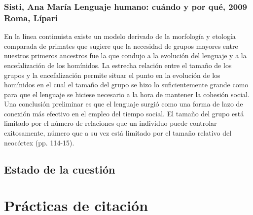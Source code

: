 \documentclass[12pt, a4paper, oneside]{report}
\begin{document}
        \subsection{Sisti, Ana María
        Lenguaje humano: cuándo y por qué, 2009
        Roma, Lípari}
        En la línea continuista existe un modelo derivado de la morfología y etología comparada de primates que sugiere que la necesidad de grupos mayores entre nuestros primeros ancestros fue la que condujo a la evolución del lenguaje y a la encefalización de los homínidos. La estrecha relación entre el tamaño de los grupos y la encefalización permite situar el punto en la evolución de los homínidos en el cual el tamaño del grupo se hizo lo suficientemente grande como para que el lenguaje se hiciese necesario a la hora de mantener la cohesión social. Una conclusión preliminar es que el lenguaje surgió como una forma de lazo de conexión más efectivo en el empleo del tiempo social. El tamaño del grupo está limitado por el número de relaciones que un individuo puede controlar exitosamente, número que a su vez está limitado por el tamaño relativo del neocórtex (pp. 114-15).
        \section*{Estado de la cuestión}
        \clearpage

    \chapter{Prácticas de citación}
\end{document}
